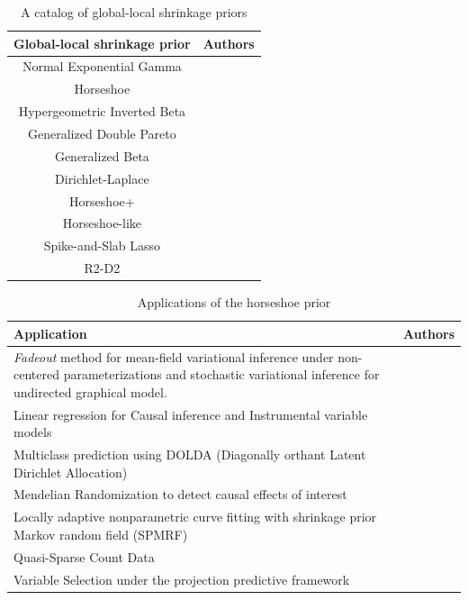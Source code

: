 \documentclass[11pt]{article}
\begin{document}
\begin{table}[htbp]
  \centering
  \caption{A catalog of global-local shrinkage priors}
  \footnotesize{
    \begin{tabular}{|c|c|}
    \hline
    Global-local shrinkage prior  & Authors  \bigstrut\\
    \hline
    Normal Exponential Gamma & \citet{griffin2005alternative} \bigstrut[t]\\
    Horseshoe & \citet{carvalho2010horseshoe, carvalho2009handling} \\
    Hypergeometric Inverted Beta & \citet{polson2010large} \\
    Generalized Double Pareto & \citet{armagan2011generalized} \\
    Generalized Beta  & \citet{armagan2013generalized} \\
    Dirichlet-Laplace & \citet{bhattacharya2014dirichlet} \\
    Horseshoe+  & \citet{bhadra2015horseshoe+} \\
    Horseshoe-like & \citet{bhadra2017horseshoe} \\
    Spike-and-Slab Lasso & \citet{rovckova2016spike} \\
    R2-D2 & \citet{zhang2016high} \bigstrut[b]\\
    \hline
    \end{tabular}%
    }
  \label{tab:one-gps}%
\end{table}%

\begin{table}[htbp]
  \centering
  \caption{Applications of the horseshoe prior}
  \footnotesize{
    \begin{tabular}{|p{3in}|p{1.5in}|}
    \hline
    Application  & Authors \bigstrut\\
    \hline
    \textit{Fadeout} method for mean-field variational inference under non-centered parameterizations and stochastic variational inference for undirected graphical model.  & \citet{ingraham_bayesian_2016} \bigstrut[t]\\
    \hline
    Linear regression for Causal inference and Instrumental variable models  & \citet{hahn_shrinkage_2014, hahn_elliptical_2016} \\
    \hline
    Multiclass prediction using DOLDA (Diagonally orthant Latent Dirichlet Allocation)  & \citet{magnusson_dolda_2016} \\
    \hline
    Mendelian Randomization to detect causal effects of interest & \citet{berzuini_mendelian_2016} \\
    \hline 
    Locally adaptive nonparametric curve fitting with shrinkage prior Markov random field (SPMRF) & \citet{faulkner_bayesian_2015} \\
    \hline
    Quasi-Sparse Count Data & \citet{datta2016bayesian} \\
    \hline
    Variable Selection under the projection predictive framework  & \citet{piironen_projection_2015} \bigstrut[b]\\
    \hline
    \end{tabular}%
    }
  \label{tab:hs-apps}%
\end{table}%
\end{document}
